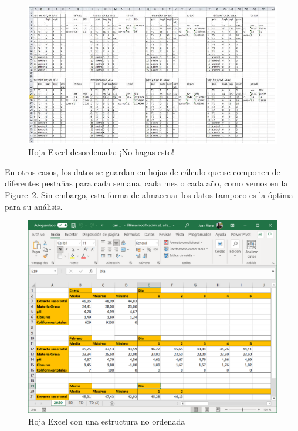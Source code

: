 \documentclass[
  letterpaper,
]{scrbook}
\begin{document}
\begin{figure}

{\centering \includegraphics{./01-imagenes/excel_mess.png}

}

\caption{\label{fig-excel_mess}Hoja Excel desordenada: ¡No hagas esto!}

\end{figure}

En otros casos, los datos se guardan en hojas de cálculo que se componen
de diferentes pestañas para cada semana, cada mes o cada año, como vemos
en la Figure~\ref{fig-2021-09-1_excel_1}. Sin embargo, esta forma de
almacenar los datos tampoco es la óptima para su análisis.

\begin{figure}

{\centering \includegraphics{./01-imagenes/2021-09-1_excel_1.png}

}

\caption{\label{fig-2021-09-1_excel_1}Hoja Excel con una estructura no
ordenada}

\end{figure}
\end{document}
